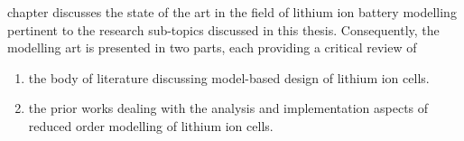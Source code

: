 
 chapter  discusses the  state of  the art  in the  field of
lithium ion battery modelling pertinent  to the research sub-topics discussed in
this thesis.  Consequently, the modelling  art is  presented in two  parts, each
providing a critical review of
\begin{enumerate}[topsep=0pt, before={\vspace*{-0.25\baselineskip}}]
    \item the body of literature discussing model-based design of lithium ion cells.
    \item the prior works dealing with the analysis and implementation aspects
        of reduced order modelling of lithium ion cells.
\end{enumerate}


